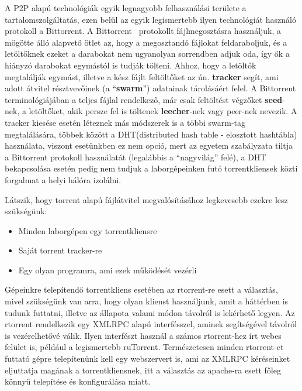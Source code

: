 A P2P alapú technológiák egyik legnagyobb felhasználási területe a tartalomszolgáltatás, ezen belül
az egyik legismertebb ilyen technológiát használó protokoll a Bittorrent. A Bittorrent~\cite{cohen2008bittorrent} protokollt
fájlmegosztásra használjuk, a mögötte álló alapvető ötlet az, hogy a megosztandó fájlokat
feldaraboljuk, és a letöltőknek ezeket a darabokat nem ugyanolyan sorrendben adjuk oda, így ők a
hiányzó darabokat egymástól is tudják tölteni. Ahhoz, hogy a letöltők megtalálják egymást, illetve a kész fájlt feltöltőket az ún. \textbf{tracker} segít, ami adott átvitel résztvevőinek (a ``\textbf{swarm}'') adatainak tárolásáért felel. A Bittorrent terminológiájában a teljes fájlal rendelkező, már csak feltöltést végzőket \textbf{seed}-nek, a letöltőket, akik persze fel is töltenek \textbf{leecher}-nek vagy peer-nek nevezik. A tracker kiesése esetén léteznek más módszerek is a többi swarm-tag megtalálására, többek között a DHT\cite{rescorla2006introduction}(distributed hash table - elosztott hashtábla) használata, viszont esetünkben ez nem opció, mert az egyetem szabályzata tiltja a Bittorrent protokoll használatát (legalábbis a ``nagyvilág'' felé), a DHT bekapcsolása esetén pedig nem tudjuk a laborgépeinken futó torrentkliensek közti forgalmat a helyi hálóra izolálni.

Látszik, hogy torrent alapú fájlátvitel megvalósításához legkevesebb ezekre lesz szükségünk:
\begin{itemize}
	\item Minden laborgépen egy torrentkliensre
	\item Saját torrent tracker-re
	\item Egy olyan programra, ami ezek működését vezérli
\end{itemize}

Gépeinkre telepítendő torrentkliens esetében az rtorrent-re\cite{sundell2012libtorrent} esett a választás, mivel szükségünk van arra, hogy olyan klienst használjunk, amit a háttérben is tudunk futtatni, illetve az állapota valami módon távolról is lekérhető legyen. Az rtorrent rendelkezik egy XMLRPC\cite{merrick2006xml} alapú interfésszel, aminek segítségével távolról is vezérelhetővé válik. Ilyen interfészt használ a számos rtorrent-hez írt webes felület is, például a legismertebb ruTorrent\cite{rutorrent}. Természetesen minden rtorrent-et futtató gépre telepítenünk kell egy webszervert is, ami az XMLRPC kéréseinket eljuttatja magának a torrentkliensnek, itt a választás az apache-ra\cite{fielding1997apache} esett főleg könnyű telepítése és konfigurálása miatt.

